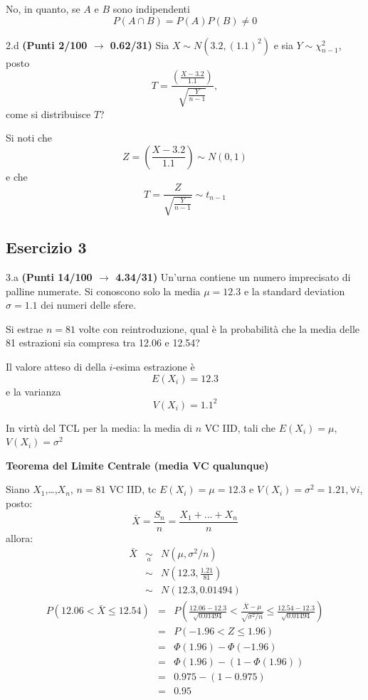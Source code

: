 \documentclass[
  11pt,
]{book}
\theoremstyle{mytheoremstyle}
\theoremstyle{mydefstyle}
\newenvironment{sol}
  {
  \begin{tcolorbox}[enhanced,breakable,arc=0.1mm,boxrule=1pt,colback=white,colframe=iblue,
  title=\bf \fontfamily{lmss}\selectfont \hspace{.5 cm} Soluzione,drop fuzzy shadow]

}{
\end{tcolorbox}
  }
\begin{document}
\begin{sol}
No, in quanto, se \(A\) e \(B\) sono indipendenti
\[P(A\cap B)=P(A)P(B)\neq0\]

\end{sol}

2.d \textbf{(Punti 2/100 \(\rightarrow\) 0.62/31)} Sia \(X\sim N(3.2,(1.1)^2)\) e sia \(Y\sim\chi_{n-1}^2\), posto
\[
T=\frac{\left(\frac{X-3.2}{1.1}\right)}{\sqrt{\frac{Y}{n-1}}},
\]
come si distribuisce \(T\)?

\begin{sol}
Si noti che
\[
Z=\left(\frac{X-3.2}{1.1}\right)\sim N(0,1)
\]
e che
\[
T=\frac{Z}{\sqrt{\frac{Y}{n-1}}}\sim t_{n-1}
\]

\end{sol}

\subsection{Esercizio 3}\label{esercizio-3-6}

3.a \textbf{(Punti 14/100 \(\rightarrow\) 4.34/31)} Un'urna contiene un numero imprecisato di palline numerate. Si conoscono solo
la media \(\mu=12.3\) e la standard deviation \(\sigma=1.1\) dei numeri delle sfere.

Si estrae \(n=81\) volte con reintroduzione, qual è la probabilità che la media delle 81 estrazioni sia compresa tra
12.06 e 12.54?

\begin{sol}
Il valore atteso di della \(i\)-esima estrazione è
\[
E(X_i)=12.3
\]
e la varianza
\[
V(X_i)=1.1^2
\]

In virtù del TCL per la media: la media di \(n\) VC IID, tali che
\(E(X_i)=\mu\), \(V(X_i)=\sigma^2\)

\textbf{Teorema del Limite Centrale (media VC qualunque)}

Siano \(X_1\),\ldots,\(X_n\), \(n=81\) VC IID, tc \(E(X_i)=\mu=12.3\) e \(V(X_i)=\sigma^2=1.21,\forall i\), posto:
\[
      \bar X=\frac{S_n}n =\frac{X_1 + ... + X_n}n
      \]
allora:\begin{eqnarray*}
  \bar X & \mathop{\sim}\limits_{a}& N(\mu,\sigma^2/n) \\
     &\sim & N\left(12.3,\frac{1.21}{81}\right) \\
     &\sim & N(12.3,0.01494)
  \end{eqnarray*}\begin{eqnarray*}
   P( 12.06 < \bar X \leq  12.54 ) &=& P\left( \frac { 12.06  -  12.3 }{\sqrt{ 0.01494 }} < \frac { \bar X  -  \mu }{ \sqrt{\sigma^2/n} } \leq \frac { 12.54  -  12.3 }{\sqrt{ 0.01494 }}\right)  \\
              &=& P\left(  -1.96  < Z \leq  1.96 \right) \\
              &=& \Phi( 1.96 )-\Phi( -1.96 )\\
              &=&  \Phi( 1.96 )-(1-\Phi( 1.96 )) \\ &=&  0.975 -(1- 0.975 ) \\ 
              &=&  0.95 
   \end{eqnarray*}

\end{sol}
\end{document}
